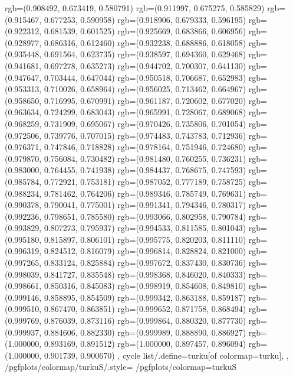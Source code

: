 {{{					rgb=(0.908492, 0.673419, 0.580791)
					rgb=(0.911997, 0.675275, 0.585829)
					rgb=(0.915467, 0.677253, 0.590958)
					rgb=(0.918906, 0.679333, 0.596195)
					rgb=(0.922312, 0.681539, 0.601525)
					rgb=(0.925669, 0.683866, 0.606956)
					rgb=(0.928977, 0.686316, 0.612460)
					rgb=(0.932238, 0.688886, 0.618058)
					rgb=(0.935448, 0.691564, 0.623735)
					rgb=(0.938597, 0.694360, 0.629468)
					rgb=(0.941681, 0.697278, 0.635273)
					rgb=(0.944702, 0.700307, 0.641130)
					rgb=(0.947647, 0.703444, 0.647044)
					rgb=(0.950518, 0.706687, 0.652983)
					rgb=(0.953313, 0.710026, 0.658964)
					rgb=(0.956025, 0.713462, 0.664967)
					rgb=(0.958650, 0.716995, 0.670991)
					rgb=(0.961187, 0.720602, 0.677020)
					rgb=(0.963634, 0.724299, 0.683043)
					rgb=(0.965991, 0.728067, 0.689068)
					rgb=(0.968259, 0.731909, 0.695067)
					rgb=(0.970426, 0.735806, 0.701054)
					rgb=(0.972506, 0.739776, 0.707015)
					rgb=(0.974483, 0.743783, 0.712936)
					rgb=(0.976371, 0.747846, 0.718828)
					rgb=(0.978164, 0.751946, 0.724680)
					rgb=(0.979870, 0.756084, 0.730482)
					rgb=(0.981480, 0.760255, 0.736231)
					rgb=(0.983000, 0.764455, 0.741938)
					rgb=(0.984437, 0.768675, 0.747593)
					rgb=(0.985784, 0.772921, 0.753181)
					rgb=(0.987052, 0.777189, 0.758725)
					rgb=(0.988234, 0.781462, 0.764206)
					rgb=(0.989346, 0.785749, 0.769631)
					rgb=(0.990378, 0.790041, 0.775001)
					rgb=(0.991341, 0.794346, 0.780317)
					rgb=(0.992236, 0.798651, 0.785580)
					rgb=(0.993066, 0.802958, 0.790784)
					rgb=(0.993829, 0.807273, 0.795937)
					rgb=(0.994533, 0.811585, 0.801043)
					rgb=(0.995180, 0.815897, 0.806101)
					rgb=(0.995775, 0.820203, 0.811110)
					rgb=(0.996319, 0.824512, 0.816079)
					rgb=(0.996814, 0.828824, 0.821000)
					rgb=(0.997265, 0.833124, 0.825884)
					rgb=(0.997672, 0.837430, 0.830736)
					rgb=(0.998039, 0.841727, 0.835548)
					rgb=(0.998368, 0.846020, 0.840333)
					rgb=(0.998661, 0.850316, 0.845083)
					rgb=(0.998919, 0.854608, 0.849810)
					rgb=(0.999146, 0.858895, 0.854509)
					rgb=(0.999342, 0.863188, 0.859187)
					rgb=(0.999510, 0.867470, 0.863851)
					rgb=(0.999652, 0.871758, 0.868494)
					rgb=(0.999769, 0.876039, 0.873116)
					rgb=(0.999864, 0.880320, 0.877730)
					rgb=(0.999937, 0.884606, 0.882330)
					rgb=(0.999989, 0.888890, 0.886927)
					rgb=(1.000000, 0.893169, 0.891512)
					rgb=(1.000000, 0.897457, 0.896094)
					rgb=(1.000000, 0.901739, 0.900670)
			},
		cycle list/.define={turku}{[of colormap=turku]},
		},
		/pgfplots/colormap/turkuS/.style={
			/pgfplots/colormap={turkuS}{%
}}}
